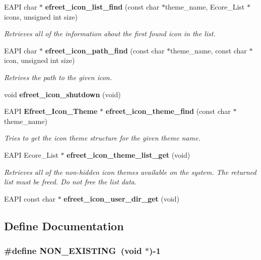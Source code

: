 \begin{CompactItemize}
\item 
EAPI char $\ast$ {\bf efreet\_\-icon\_\-list\_\-find} (const char $\ast$theme\_\-name, Ecore\_\-List $\ast$icons, unsigned int size)
\begin{CompactList}\small\item\em Retrieves all of the information about the first found icon in the list. \item\end{CompactList}\item 
EAPI char $\ast$ {\bf efreet\_\-icon\_\-path\_\-find} (const char $\ast$theme\_\-name, const char $\ast$icon, unsigned int size)
\begin{CompactList}\small\item\em Retrives the path to the given icon. \item\end{CompactList}\item 
void {\bf efreet\_\-icon\_\-shutdown} (void)
\item 
EAPI {\bf Efreet\_\-Icon\_\-Theme} $\ast$ {\bf efreet\_\-icon\_\-theme\_\-find} (const char $\ast$theme\_\-name)
\begin{CompactList}\small\item\em Tries to get the icon theme structure for the given theme name. \item\end{CompactList}\item 
EAPI Ecore\_\-List $\ast$ {\bf efreet\_\-icon\_\-theme\_\-list\_\-get} (void)
\begin{CompactList}\small\item\em Retrieves all of the non-hidden icon themes available on the system. The returned list must be freed. Do not free the list data. \item\end{CompactList}\item 
EAPI const char $\ast$ {\bf efreet\_\-icon\_\-user\_\-dir\_\-get} (void)
\end{CompactItemize}


\subsection{Define Documentation}
\subsubsection{\setlength{\rightskip}{0pt plus 5cm}\#define NON\_\-EXISTING~(void $\ast$)-1}\label{efreet__icon_8c_3da87339a2ab67dd100b8fc9efa92247}




